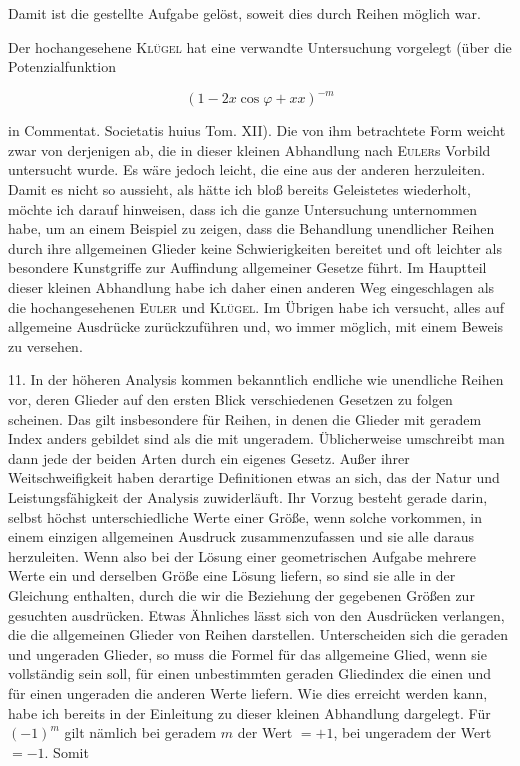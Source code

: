 Damit ist die gestellte Aufgabe gelöst, soweit dies durch Reihen möglich war.

Der hochangesehene \textsc{Kl\"ugel} hat eine verwandte Untersuchung vorgelegt (über die Potenzialfunktion

\[
(1-2x\cos\varphi+xx)^{-m}
\]

\noindent in Commentat. Societatis huius Tom. XII). Die von ihm betrachtete Form
weicht zwar von derjenigen ab, die in dieser kleinen Abhandlung nach \textsc{Euler}s Vorbild untersucht wurde.
Es wäre jedoch leicht, die eine aus der anderen herzuleiten. Damit es nicht so aussieht,
als hätte ich bloß bereits Geleistetes wiederholt, möchte ich darauf hinweisen, dass ich die ganze Untersuchung
unternommen habe, um an einem Beispiel zu zeigen, dass die Behandlung unendlicher Reihen durch ihre allgemeinen Glieder
keine Schwierigkeiten bereitet und oft leichter als besondere Kunstgriffe zur Auffindung allgemeiner Gesetze führt.
Im Hauptteil dieser kleinen Abhandlung habe ich daher einen anderen Weg eingeschlagen
als die hochangesehenen \textsc{Euler} und \textsc{Kl\"ugel}. Im Übrigen habe ich versucht, alles auf allgemeine Ausdrücke zurückzuführen
und, wo immer möglich, mit einem Beweis zu versehen.


11. In der höheren Analysis kommen bekanntlich endliche wie unendliche Reihen vor, deren Glieder
auf den ersten Blick verschiedenen Gesetzen zu folgen scheinen. Das gilt insbesondere für Reihen, in
denen die Glieder mit geradem Index anders gebildet sind als die mit ungeradem.
Üblicherweise umschreibt man dann jede der beiden Arten durch ein eigenes Gesetz. Außer ihrer Weitschweifigkeit
haben derartige Definitionen etwas an sich, das der Natur und Leistungsfähigkeit der Analysis zuwiderläuft. Ihr Vorzug
besteht gerade darin, selbst höchst unterschiedliche Werte einer Größe, wenn solche vorkommen,
in einem einzigen allgemeinen Ausdruck zusammenzufassen und sie alle daraus herzuleiten.
Wenn also bei der Lösung einer geometrischen Aufgabe mehrere Werte ein und derselben Größe eine Lösung liefern,
so sind sie alle in der Gleichung enthalten, durch die wir die Beziehung der gegebenen Größen
zur gesuchten ausdrücken. Etwas Ähnliches lässt sich von den Ausdrücken verlangen, die die allgemeinen
Glieder von Reihen darstellen. Unterscheiden sich die geraden und
ungeraden Glieder, so muss die Formel für das allgemeine Glied, wenn sie vollständig sein soll,
für einen unbestimmten geraden Gliedindex die einen und für einen
ungeraden die anderen Werte liefern. Wie dies erreicht werden kann, habe ich bereits in der Einleitung
zu dieser kleinen Abhandlung dargelegt. Für $(-1)^m$ gilt nämlich bei geradem $m$ der Wert $=+1$, bei ungeradem der Wert $=-1$. Somit
